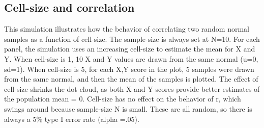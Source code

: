 \documentclass[
  letterpaper,
  DIV=11,
  numbers=noendperiod]{scrreprt}
\begin{document}
\subsection{Cell-size and correlation}\label{cell-size-and-correlation}

This simulation illustrates how the behavior of correlating two random
normal samples as a function of cell-size. The sample-size is always set
at N=10. For each panel, the simulation uses an increasing cell-size to
estimate the mean for X and Y. When cell-size is 1, 10 X and Y values
are drawn from the same normal (u=0, sd=1). When cell-size is 5, for
each X,Y score in the plot, 5 samples were drawn from the same normal,
and then the mean of the samples is plotted. The effect of cell-size
shrinks the dot cloud, as both X and Y scores provide better estimates
of the population mean = 0. Cell-size has no effect on the behavior of
r, which swings around because sample-size N is small. These are all
random, so there is always a 5\% type I error rate (alpha =.05).
\end{document}
